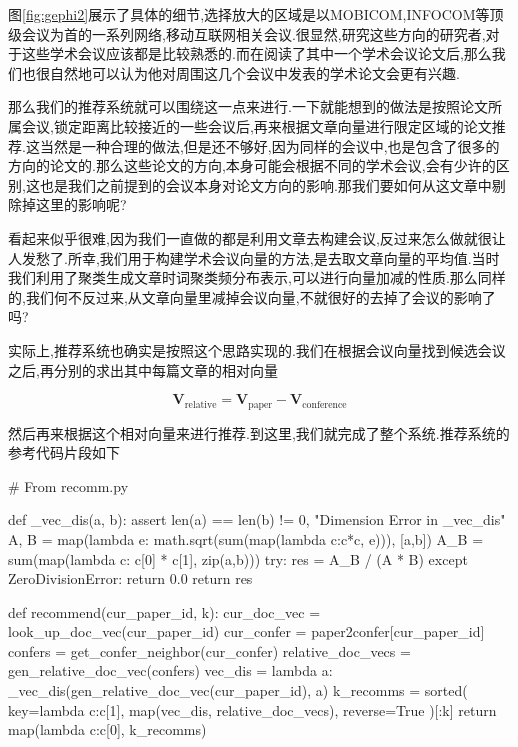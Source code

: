 图\ref{fig:gephi2}展示了具体的细节,选择放大的区域是以MOBICOM,INFOCOM等顶级会议为首的一系列网络,移动互联网相关会议.很显然,研究这些方向的研究者,对于这些学术会议应该都是比较熟悉的.而在阅读了其中一个学术会议论文后,那么我们也很自然地可以认为他对周围这几个会议中发表的学术论文会更有兴趣.

那么我们的推荐系统就可以围绕这一点来进行.一下就能想到的做法是按照论文所属会议,锁定距离比较接近的一些会议后,再来根据文章向量进行限定区域的论文推荐.这当然是一种合理的做法,但是还不够好,因为同样的会议中,也是包含了很多的方向的论文的.那么这些论文的方向,本身可能会根据不同的学术会议,会有少许的区别,这也是我们之前提到的会议本身对论文方向的影响.那我们要如何从这文章中剔除掉这里的影响呢?

看起来似乎很难,因为我们一直做的都是利用文章去构建会议,反过来怎么做就很让人发愁了.所幸,我们用于构建学术会议向量的方法,是去取文章向量的平均值.当时我们利用了聚类生成文章时词聚类频分布表示,可以进行向量加减的性质.那么同样的,我们何不反过来,从文章向量里减掉会议向量,不就很好的去掉了会议的影响了吗?

实际上,推荐系统也确实是按照这个思路实现的.我们在根据会议向量找到候选会议之后,再分别的求出其中每篇文章的相对向量

\begin{equation}
	\textbf{V}_{\mbox{relative}} = \textbf{V}_{\mbox{paper}} - \textbf{V}_{\mbox{conference}}
\end{equation}

然后再来根据这个相对向量来进行推荐.到这里,我们就完成了整个系统.推荐系统的参考代码片段如下

\begin{python}
# From recomm.py

def _vec_dis(a, b):
	assert len(a) == len(b) != 0, "Dimension Error in _vec_dis"  
	A, B = map(lambda e: math.sqrt(sum(map(lambda c:c*c, e))), [a,b])
	A_B = sum(map(lambda c: c[0] * c[1], zip(a,b)))
	try:
		res = A_B / (A * B)
	except ZeroDivisionError:
    	return 0.0
	return res

def recommend(cur_paper_id, k):
	cur_doc_vec = look_up_doc_vec(cur_paper_id)
	cur_confer = paper2confer[cur_paper_id]	
	confers = get_confer_neighbor(cur_confer)	
	relative_doc_vecs = gen_relative_doc_vec(confers)
	vec_dis = lambda a: _vec_dis(gen_relative_doc_vec(cur_paper_id), a)
	k_recomms = sorted(
		key=lambda c:c[1],
		map(vec_dis, relative_doc_vecs),
		reverse=True	
		)[:k]
	return map(lambda c:c[0], k_recomms)
	
\end{python}


